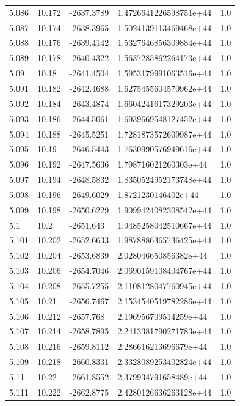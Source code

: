\begin{tabular}{lllll}
5.086 & 10.172 & -2637.3789 & 1.4726641226598751e+44 & 1.0 \\
5.087 & 10.174 & -2638.3965 & 1.5024139113469468e+44 & 1.0 \\
5.088 & 10.176 & -2639.4142 & 1.5327646856309884e+44 & 1.0 \\
5.089 & 10.178 & -2640.4322 & 1.5637285862264173e+44 & 1.0 \\
5.09 & 10.18 & -2641.4504 & 1.5953179991063516e+44 & 1.0 \\
5.091 & 10.182 & -2642.4688 & 1.6275455604570962e+44 & 1.0 \\
5.092 & 10.184 & -2643.4874 & 1.6604241617329203e+44 & 1.0 \\
5.093 & 10.186 & -2644.5061 & 1.6939669548127452e+44 & 1.0 \\
5.094 & 10.188 & -2645.5251 & 1.7281873572609987e+44 & 1.0 \\
5.095 & 10.19 & -2646.5443 & 1.7630990576949616e+44 & 1.0 \\
5.096 & 10.192 & -2647.5636 & 1.798716021260303e+44 & 1.0 \\
5.097 & 10.194 & -2648.5832 & 1.8350524952173748e+44 & 1.0 \\
5.098 & 10.196 & -2649.6029 & 1.8721230146402e+44 & 1.0 \\
5.099 & 10.198 & -2650.6229 & 1.9099424082308542e+44 & 1.0 \\
5.1 & 10.2 & -2651.643 & 1.9485258042510667e+44 & 1.0 \\
5.101 & 10.202 & -2652.6633 & 1.9878886365736425e+44 & 1.0 \\
5.102 & 10.204 & -2653.6839 & 2.028046650856382e+44 & 1.0 \\
5.103 & 10.206 & -2654.7046 & 2.0690159108404767e+44 & 1.0 \\
5.104 & 10.208 & -2655.7255 & 2.1108128047760945e+44 & 1.0 \\
5.105 & 10.21 & -2656.7467 & 2.1534540519782286e+44 & 1.0 \\
5.106 & 10.212 & -2657.768 & 2.196956709514259e+44 & 1.0 \\
5.107 & 10.214 & -2658.7895 & 2.2413381790271783e+44 & 1.0 \\
5.108 & 10.216 & -2659.8112 & 2.286616213696679e+44 & 1.0 \\
5.109 & 10.218 & -2660.8331 & 2.3328089253402824e+44 & 1.0 \\
5.11 & 10.22 & -2661.8552 & 2.379934791658489e+44 & 1.0 \\
5.111 & 10.222 & -2662.8775 & 2.4280126636263128e+44 & 1.0 \\

\end{tabular}
